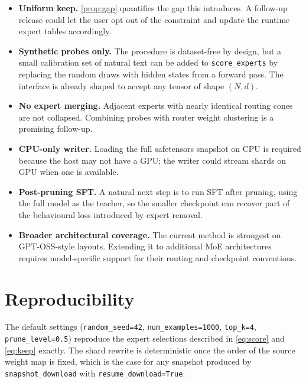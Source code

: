 \documentclass[11pt,a4paper]{article}
\newcommand{\1}{\mathbf{1}}
\theoremstyle{plain}
\begin{document}
\begin{itemize}
  \item \textbf{Uniform keep.}  \autoref{prop:gap} quantifies the gap
  this introduces.  A follow-up release could let the user opt out
  of the constraint and update the runtime expert tables accordingly.
  \item \textbf{Synthetic probes only.}  The procedure is dataset-free
  by design, but a small calibration set of natural text can be added
  to \texttt{score\_experts} by replacing the random draws with
  hidden states from a forward pass.  The interface is already
  shaped to accept any tensor of shape $(N, d)$.
  \item \textbf{No expert merging.}  Adjacent experts with nearly
  identical routing cones are not collapsed.  Combining probes with
  router weight clustering is a promising follow-up.
  \item \textbf{CPU-only writer.}  Loading the full safetensors
  snapshot on CPU is required because the host may not have a GPU;
  the writer could stream shards on GPU when one is available.
  \item \textbf{Post-pruning SFT.}  A natural next step is to run SFT
  after pruning, using the full model as the teacher, so the smaller
  checkpoint can recover part of the behavioural loss introduced by
  expert removal.
  \item \textbf{Broader architectural coverage.}  The current method is
  strongest on GPT-OSS-style layouts.  Extending it to additional MoE
  architectures requires model-specific support for their routing and
  checkpoint conventions.
\end{itemize}

\section*{Reproducibility}

The default settings (\texttt{random\_seed=42}, \texttt{num\_examples=1000},
\texttt{top\_k=4}, \texttt{prune\_level=0.5}) reproduce the expert
selections described in \eqref{eq:score} and \eqref{eq:keep} exactly.  The shard
rewrite is deterministic once the order of the source weight map is
fixed, which is the case for any snapshot produced by
\texttt{snapshot\_download} with \texttt{resume\_download=True}.
\end{document}
